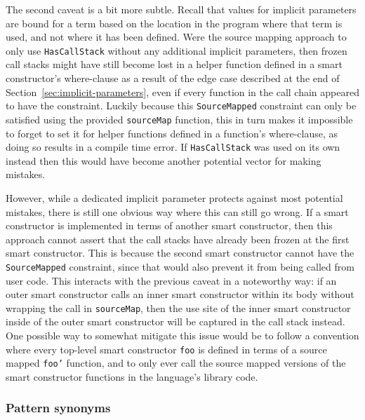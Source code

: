 \documentclass[fontsize=11pt,a4paper,parskip=half,numbers=noenddot]{scrartcl}
\newcommand{\hask}[1]{\texttt{#1}}
\begin{document}
The second caveat is a bit more subtle. Recall that values for implicit
parameters are bound for a term based on the location in the program where that
term is used, and not where it has been defined. Were the source mapping
approach to only use \hask{HasCallStack} without any additional implicit
parameters, then frozen call stacks might have still become lost in a helper
function defined in a smart constructor's where-clause as a result of the edge
case described at the end of Section~\ref{sec:implicit-parameters}, even if
every function in the call chain appeared to have the constraint. Luckily
because this \hask{SourceMapped} constraint can only be satisfied using the
provided \hask{sourceMap} function, this in turn makes it impossible to forget
to set it for helper functions defined in a function's where-clause, as doing so
results in a compile time error. If \hask{HasCallStack} was used on its own
instead then this would have become another potential vector for making
mistakes.

However, while a dedicated implicit parameter protects against most potential
mistakes, there is still one obvious way where this can still go wrong. If a
smart constructor is implemented in terms of another smart constructor, then
this approach cannot assert that the call stacks have already been frozen at the
first smart constructor. This is because the second smart constructor cannot
have the \hask{SourceMapped} constraint, since that would also prevent it from
being called from user code. This interacts with the previous caveat in a
noteworthy way: if an outer smart constructor calls an inner smart constructor
within its body without wrapping the call in \hask{sourceMap}, then the use site
of the inner smart constructor inside of the outer smart constructor will be
captured in the call stack instead. One possible way to somewhat mitigate this
issue would be to follow a convention where every top-level smart constructor
\hask{foo} is defined in terms of a source mapped \hask{foo'} function, and to
only ever call the source mapped versions of the smart constructor functions in
the language's library code.

\subsubsection{Pattern synonyms}

\end{document}
